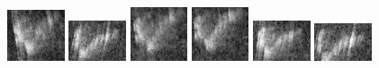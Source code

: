 \begin{figure}
    \includegraphics[width=0.15\textwidth]{chapters/images/dataset/all-class-images/hook/hook-74.jpg}
    \includegraphics[width=0.15\textwidth]{chapters/images/dataset/all-class-images/hook/hook-130.jpg}
    \includegraphics[width=0.15\textwidth]{chapters/images/dataset/all-class-images/hook/hook-61.jpg}
    \includegraphics[width=0.15\textwidth]{chapters/images/dataset/all-class-images/hook/hook-51.jpg}
    \includegraphics[width=0.15\textwidth]{chapters/images/dataset/all-class-images/hook/hook-121.jpg}
    \includegraphics[width=0.15\textwidth]{chapters/images/dataset/all-class-images/hook/hook-132.jpg}
        

\end{figure}
